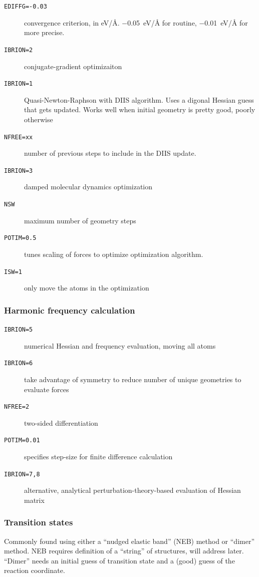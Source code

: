 \documentclass[11pt]{article}
\begin{document}
\begin{description}
\item[{\texttt{EDIFFG=-0.03}}] convergence criterion, in eV/\AA{}.  \SI{-0.05}{eV/\angstrom} for routine, \SI{-0.01}{eV/\angstrom} for more precise.
\item[{\texttt{IBRION=2}}] conjugate-gradient optimizaiton
\item[{\texttt{IBRION=1}}] Quasi-Newton-Raphson with DIIS algorithm.  Uses a digonal Hessian guess that gets updated.  Works well when initial geometry is pretty good, poorly otherwise
\item[{\texttt{NFREE=xx}}] number of previous steps to include in the DIIS update.
\item[{\texttt{IBRION=3}}] damped molecular dynamics optimization
\item[{\texttt{NSW}}] maximum number of geometry steps
\item[{\texttt{POTIM=0.5}}] tunes scaling of forces to optimize optimization algorithm.
\item[{\texttt{ISW=1}}] only move the atoms in the optimization
\end{description}

\subsubsection{Harmonic frequency calculation}
\label{sec:org45bc3e4}
\begin{description}
\item[{\texttt{IBRION=5}}] numerical Hessian and frequency evaluation, moving all atoms
\item[{\texttt{IBRION=6}}] take advantage of symmetry to reduce number of unique geometries to evaluate forces
\item[{\texttt{NFREE=2}}] two-sided differentiation
\item[{\texttt{POTIM=0.01}}] specifies step-size for finite difference calculation

\item[{\texttt{IBRION=7,8}}] alternative, analytical perturbation-theory-based evaluation of Hessian matrix
\end{description}

\subsubsection{Transition states}
\label{sec:orgc9e8723}
Commonly found using either a ``nudged elastic band'' (NEB) method or ``dimer'' method.  NEB requires definition of a ``string'' of structures, will address later.  ``Dimer'' needs an initial guess of transition state and a (good) guess of the reaction coordinate.
\end{document}
